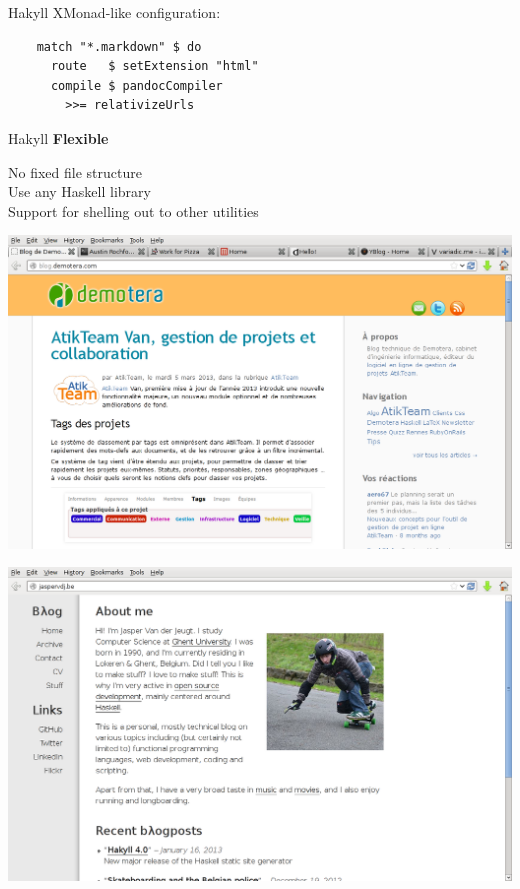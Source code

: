 \documentclass[20pt]{beamer}
\newcommand{\vspaced}{
    \vspace{5mm}
}
\begin{document}
\begin{frame}[fragile]{Hakyll}
    XMonad-like configuration: \\
    \vspaced
    \begin{lstlisting}
    match "*.markdown" $ do
      route   $ setExtension "html"
      compile $ pandocCompiler
        >>= relativizeUrls
    \end{lstlisting}
\end{frame}

\begin{frame}{Hakyll}
    \textbf{Flexible} \\
    \vspaced
    No fixed file structure \\
    Use any Haskell library \\
    Support for shelling out to other utilities \\
\end{frame}

\begin{frame}[plain]
    \includegraphics[width=\textwidth]{../2013-odhac-hakyll/images/example-demotera.png}
\end{frame}

\begin{frame}[plain]
    \includegraphics[width=\textwidth]{../2013-odhac-hakyll/images/example-jaspervdj.png}
\end{frame}
\end{document}
